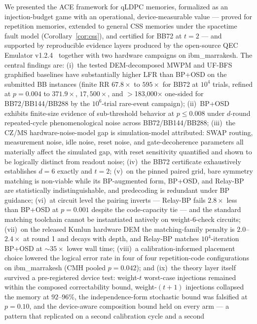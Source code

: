 \documentclass[11pt,a4paper]{article}
\begin{document}
We presented the ACE framework for qLDPC memories, formalized as an
injection-budget game with an operational, device-measurable value ---
proved for repetition memories, extended to general CSS memories under
the spacetime fault model (Corollary~\ref{cor:css}), and certified for
BB72 at $t=2$ --- and supported by reproducible evidence layers
produced by the open-source
QEC Emulator v1.2.4~\cite{AlDaajeh2026emulator} together with two
hardware campaigns on ibm\_marrakesh.
The central findings are:
(i)~the tested DEM-decomposed MWPM and UF-BFS graphified baselines have substantially higher LFR than BP+OSD on the submitted BB instances (finite RR $67.8\times$ to $595\times$ for BB72 at $10^{4}$ trials,
refined at $p=0.004$ to $371.9\times$, $17{,}500\times$, and
$>$183{,}000$\times$ one-sided for BB72/BB144/BB288 by the $10^{6}$-trial
rare-event campaign);
(ii)~BP+OSD exhibits finite-size evidence of sub-threshold behavior at $p\le0.008$ under
$d$-round repeated-cycle phenomenological noise across BB72/BB144/BB288;
(iii)~the CZ/MS hardware-noise-model gap is simulation-model attributed: SWAP routing, measurement noise, idle noise, reset noise, and gate-decoherence parameters all materially affect the simulated gap, with reset sensitivity quantified and shown to be logically distinct from readout noise;
(iv)~the BB72 certificate exhaustively establishes $d=6$ exactly and $t=2$;
(v)~on the pinned paired grid, bare symmetry matching is non-viable while its BP-augmented form, BP+OSD, and Relay-BP are statistically indistinguishable, and predecoding is redundant under BP guidance;
(vi)~at circuit level the pairing inverts --- Relay-BP fails
$2.8\times$ less than BP+OSD at $p=0.001$ despite the code-capacity
tie --- and the standard matching toolchain cannot be instantiated
natively on weight-6-check circuits;
(vii)~on the released Kunlun hardware DEM the matching-family penalty
is $2.0$--$2.4\times$ at round 1 and decays with depth, and Relay-BP
matches $10^4$-iteration BP+OSD at $\sim\!35\times$ lower wall time;
(viii)~a calibration-informed placement choice lowered the logical
error rate in four of four repetition-code configurations on
ibm\_marrakesh (CMH pooled $p=0.042$);
and (ix)~the theory layer itself survived a pre-registered device test:
weight-$t$ worst-case injections remained within the composed
correctability bound, weight-$(t{+}1)$ injections collapsed the memory
at $92$--$96\%$, the independence-form stochastic bound was falsified
at $p=0.10$, and the device-aware composition bound held on every arm
--- a pattern that replicated on a second calibration cycle and a second
\end{document}
